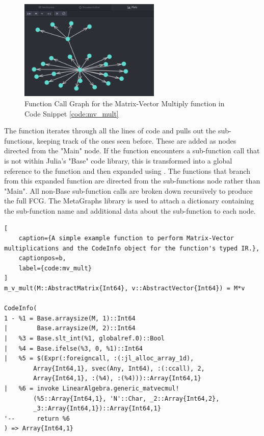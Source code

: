 \begin{figure}[htb!]
    \centering
    \includegraphics[width=0.6\textwidth]{Images/mv_fcg.png}
    \caption{Function Call Graph for the Matrix-Vector Multiply function in Code Snippet \ref{code:mv_mult}}
    \label{fig:mvfcg}
\end{figure}

\pagebreak

The function iterates through all the lines of code and pulls out the sub-functions, keeping track of the ones seen before. These are added as nodes directed from the "Main" node. If the function encounters a sub-function call that is not within Julia's "Base" code library, this is transformed into a global reference to the function and then expanded using . The functions that branch from this expanded function are directed from the sub-functions node rather than "Main". All non-Base sub-function calls are broken down recursively to produce the full FCG. The MetaGraphs library is used to attach a dictionary containing the sub-function name and additional data about the sub-function to each node.


\begin{lstlisting}[
    caption={A simple example function to perform Matrix-Vector multiplications and the CodeInfo object for the function's typed IR.},
    captionpos=b, 
    label={code:mv_mult}
]
m_v_mult(M::AbstractMatrix{Int64}, v::AbstractVector{Int64}) = M*v

CodeInfo(
1 - %1 = Base.arraysize(M, 1)::Int64
|        Base.arraysize(M, 2)::Int64
|   %3 = Base.slt_int(%1, globalref.0)::Bool
|   %4 = Base.ifelse(%3, 0, %1)::Int64
|   %5 = $(Expr(:foreigncall, :(:jl_alloc_array_1d), 
		Array{Int64,1}, svec(Any, Int64), :(:ccall), 2, 
		Array{Int64,1}, :(%4), :(%4)))::Array{Int64,1}
|   %6 = invoke LinearAlgebra.generic_matvecmul!
		(%5::Array{Int64,1}, 'N'::Char, _2::Array{Int64,2}, 
		_3::Array{Int64,1})::Array{Int64,1}
'--      return %6
) => Array{Int64,1}
\end{lstlisting}



